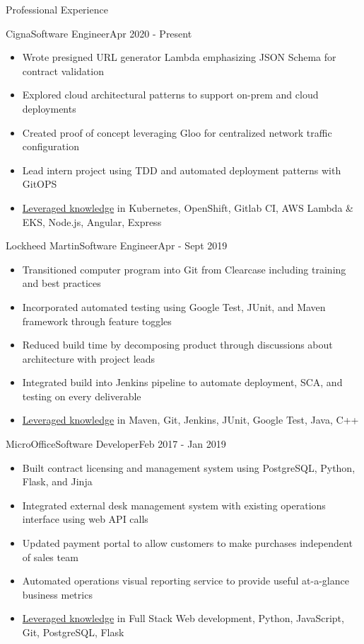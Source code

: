 \documentclass[]{mcdowellcv}
\begin{document}
	\begin{cvsection}{Professional Experience}
		\begin{cvsubsection}{Cigna}{Software Engineer}{Apr 2020 - Present}
			\begin{itemize}
				\item Wrote presigned URL generator Lambda emphasizing JSON Schema for contract validation
				\item Explored cloud architectural patterns to support on-prem and cloud deployments
				\item Created proof of concept leveraging Gloo for centralized network traffic configuration
				\item Lead intern project using TDD and automated deployment patterns with GitOPS
				\item \ul{Leveraged knowledge} in Kubernetes, OpenShift, Gitlab CI, AWS Lambda \& EKS, Node.js, Angular, Express
			\end{itemize}
	    \end{cvsubsection}
		\begin{cvsubsection}{Lockheed Martin}{Software Engineer}{Apr - Sept 2019}
			\begin{itemize}
				\item Transitioned computer program into Git from Clearcase including training and best practices
				\item Incorporated automated testing using Google Test, JUnit, and Maven framework through feature toggles
				\item Reduced build time by decomposing product through discussions about architecture with project leads
				\item Integrated build into Jenkins pipeline to automate deployment, SCA, and testing on every deliverable
				\item \ul{Leveraged knowledge} in Maven, Git, Jenkins, JUnit, Google Test, Java, C++
			\end{itemize}
	    \end{cvsubsection}
		\begin{cvsubsection}{MicroOffice}{Software Developer}{Feb 2017 - Jan 2019}
			\begin{itemize}
				\item Built contract licensing and management system using PostgreSQL, Python, Flask, and Jinja
				\item Integrated external desk management system with existing operations interface using web API calls
				\item Updated payment portal to allow customers to make purchases independent of sales team
				\item Automated operations visual reporting service to provide useful at-a-glance business metrics
				\item \ul{Leveraged knowledge} in Full Stack Web development, Python, JavaScript, Git, PostgreSQL, Flask
			\end{itemize}
	    \end{cvsubsection}
	\end{cvsection}
	
\end{document}

